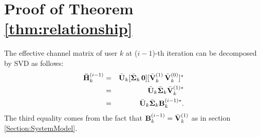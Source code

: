 \documentclass[journal,twoside]{IEEEtranTCOM}
\begin{document}
%


\appendices
\section{Proof of Theorem \ref{thm:relationship}} \label{Appendix:thm1}
The effective channel matrix of user $k$ at ($i-1$)-th iteration can be decomposed by SVD as follows:
\begin{eqnarray}
{{{\bf{\bar H}}}_k^{(i-1)}} & = & {\bar{\bf{U}}_k}[{\bar{\bf{\Sigma }}_k} \, {\bf{0}}]{[\bar{\bf{V}}_k^{(1)} \, \bar{\bf{V}}_k^{(0)}]^*} \nonumber \\
& = & {\bar{\bf{U}}_k}{\bar{\bf{\Sigma }}_k} \bar{\bf{V}}_k^{(1)*} \nonumber \\
& = & {\bar{\bf{U}}_k}{\bar{\bf{\Sigma }}_k}{\bf{B}}_k^{(i-1)*}. \label{eq:HeffPrv}
\end{eqnarray}
The third equality comes from the fact that ${\bf{B}}_k^{(i-1)}=\bar{\bf{V}}_k^{(1)}$ as in section \ref{Section:SystemModel}.
\end{document}
